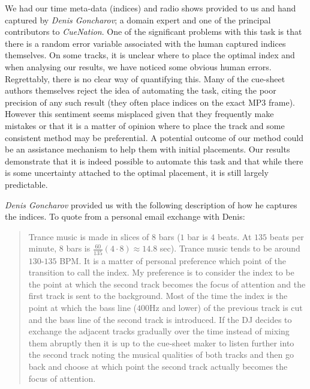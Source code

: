 \documentclass[twocolumn]{article}
\begin{document}
	We had our time meta-data (indices) and radio shows provided to us and hand captured by \textit{Denis Goncharov}; a domain expert and one of the principal contributors to \textit{CueNation}. One of the significant problems with this task is that there is a random error variable associated with the human captured indices themselves. On some tracks, it is unclear where to place the optimal index and when analysing our results, we have noticed some obvious human errors. Regrettably, there is no clear way of quantifying this. Many of the cue-sheet authors themselves reject the idea of automating the task, citing the poor precision of any such result (they often place indices on the exact MP3 frame). However this sentiment seems misplaced given that they frequently make mistakes or that it is a matter of opinion where to place the track and some consistent method may be preferential. A potential outcome of our method could be an assistance mechanism to help them with initial placements. Our results demonstrate that it is indeed possible to automate this task and that while there is some uncertainty attached to the optimal placement, it is still largely predictable.
	
	\textit{Denis Goncharov} provided us with the following description of how he captures the indices. To quote from a personal email exchange with Denis:
	
	\begin{quote}
		Trance music is made in slices of $8$ bars ($1$ bar is $4$ beats. At $135$ beats per minute, $8$ bars is $\frac{60}{135} ( 4 \cdot 8 ) \approx 14.8$ sec). Trance music tends to be around $130$-$135$ BPM. It is a matter of personal preference which point of the transition to call the index. My preference is to consider the index to be the point at which the second track becomes the focus of attention and the first track is sent to the background. Most of the time the index is the point at which the bass line ($400$Hz and lower) of the previous track is cut and the bass line of the second track is introduced. If the DJ decides to exchange the adjacent tracks gradually over the time instead of mixing them abruptly then it is up to the cue-sheet maker to listen further into the second track noting the musical qualities of both tracks and then go back and choose at which point the second track actually becomes the focus of attention.
	\end{quote}
	
\end{document}
